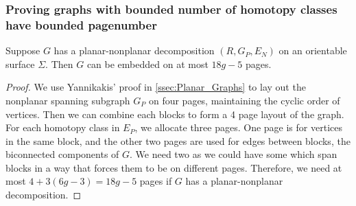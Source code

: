 \subsubsection{Proving graphs with bounded number of homotopy classes have bounded pagenumber}\label{sssec:bounded_pagenumber_homotopy}
\begin{lemma}\label{lem:planar_nonplanar_orientable}
	Suppose \(G\) has a planar-nonplanar decomposition \((R, G_P, E_N)\) on an orientable surface \(\Sigma\). Then \(G\) can be embedded on at most \(18g - 5\) pages.
\end{lemma}
\begin{proof}
	We use Yannikakis' proof in \cref{ssec:Planar_Graphs} to lay out the nonplanar spanning subgraph \(G_P\) on four pages, maintaining the cyclic order of vertices. Then we can combine each blocks to form a 4 page layout of the graph. For each homotopy class in \(E_P\), we allocate three pages. One page is for vertices in the same block, and the other two pages are used for edges between blocks, the biconnected components of \(G\). We need two as we could have some which span blocks in a way that forces them to be on different pages. Therefore, we need at most \(4 + 3(6g - 3) = 18g-5\) pages if \(G\) has a planar-nonplanar decomposition.
\end{proof}

